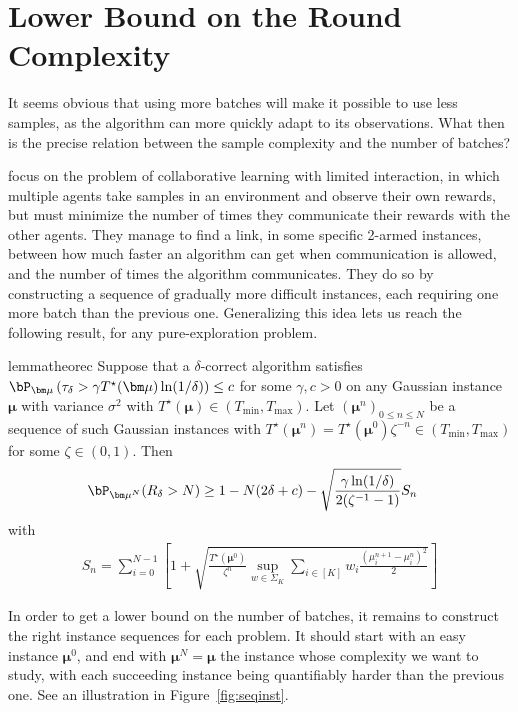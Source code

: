 

\section{Lower Bound on the Round Complexity}\label{sect:lb}


It seems obvious that using more batches will make it possible to use less samples, as the algorithm can more quickly adapt to its observations. What then is the precise relation between the sample complexity and the number of batches?

\citet{taoCollaborativeLearningLimited2019} focus on the problem of collaborative learning with limited interaction, in which multiple agents take samples in an environment and observe their own rewards, but must minimize the number of times they communicate their rewards with the other agents.
They manage to find a link, in some specific 2-armed instances, between how much faster an algorithm can get when communication is allowed, and the number of times the algorithm communicates.
They do so by constructing a sequence of gradually more difficult instances, each requiring one more batch than the previous one.
Generalizing this idea lets us reach the following result, for any pure-exploration problem.




\begin{restatable}[]{lemma}{theorec}\label{th:theorec}
	Suppose that a $\delta$-correct algorithm satisfies $\bP_{\bm\mu}\left(\tau_\delta >\gamma T^\star(\bm\mu)\ln(1/\delta)\right)\leq c$ for some $\gamma,c > 0$ on any Gaussian instance $\bm\mu$ with variance $\sigma^2$ with $T^\star(\bm\mu)\in (T_{\min},T_{\max})$.
	Let $(\bm\mu^n)_{0\leq n\leq N}$ be a sequence of such Gaussian instances with $T^\star(\bm\mu^n)=T^\star(\bm\mu^0)\zeta^{-n}\in (T_{\min},T_{\max})$ for some $\zeta\in (0,1)$.
	Then
	\begin{align*}
	&\bP_{{\bm\mu}^N}(R_\delta>N)
	\ge 1-N(2\delta+c)-\sqrt{\frac{\gamma\ln(1/\delta)}{2(\zeta^{-1}-1)}} S_n
	\end{align*}
	with
	\begin{align*}
	S_n = \sum_{i=0}^{N-1}\left[ 1+\sqrt{\frac{T^\star(\bm\mu^0)}{\zeta^{n}}\sup_{w\in \Sigma_K}\sum_{i\in[K]}w_i \frac{(\mu_i^{n+1}-\mu_i^n)^2}{2}}\right]
	\end{align*}
\end{restatable}

In order to get a lower bound on the number of batches, it remains to construct the right instance sequences for each problem.
It should start with an easy instance $\bm\mu^0$, and end with $\bm\mu^N=\bm\mu$ the instance whose complexity we want to study, with each succeeding instance being quantifiably harder than the previous one. See an illustration in Figure~\ref{fig:seqinst}.

